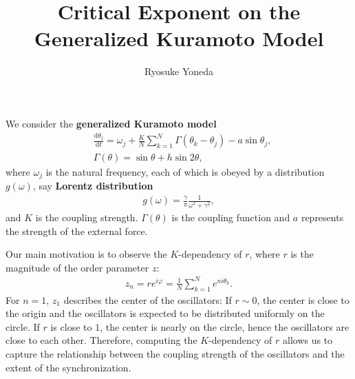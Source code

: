 \documentclass{article}
\def\d{\textrm{d}}
\begin{document}
\title{Critical Exponent on the Generalized Kuramoto Model}
\author{Ryosuke Yoneda}
\maketitle	

We consider the \textbf{generalized Kuramoto model}
\begin{align}
&\frac{\d\theta_{j}}{\d t}=\omega_{j}+\frac{K}{N}\sum_{k=1}^{N}\Gamma(\theta_{k}-\theta_{j})-a\sin\theta_{j},\\
&\Gamma(\theta)=\sin\theta+h\sin2\theta,
\end{align}
where $\omega_{j}$ is the natural frequency,
each of which is obeyed by a distribution $g(\omega)$, say \textbf{Lorentz distribution}
\begin{align}
g(\omega)=\frac{\gamma}{\pi}\frac{1}{\omega^{2}+\gamma^{2}},
\end{align}
and $K$ is the coupling strength.
$\Gamma(\theta)$ is the coupling function and $a$ represents the strength
of the external force.

Our main motivation is to observe the $K$-dependency of $r$,
where $r$ is the magnitude of the order parameter $z$:
\begin{align}
z_{n}=re^{i\varphi}=\frac{1}{N}\sum_{k=1}^{N}e^{ni\theta_{k}}.
\end{align}
For $n=1$, $z_{1}$ describes the center of the oscillators:
If $r\sim 0$, the center is close to the origin and
the oscillators is expected to be distributed uniformly
on the circle.
If $r$ is close to $1$, the center is nearly on the circle,
hence the oscillators are close to each other.
Therefore, computing the $K$-dependency of $r$
allows us to capture the relationship between
the coupling strength of the oscillators
and the extent of the synchronization.
\end{document}
